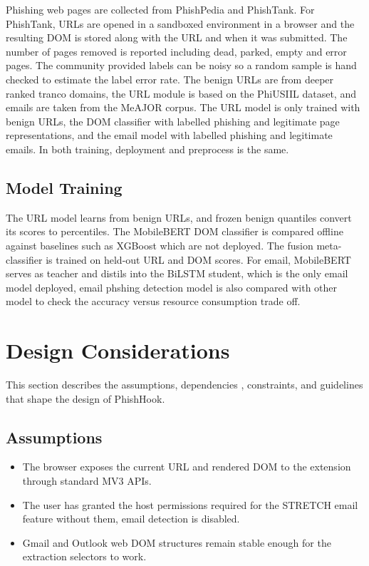 \documentclass{FastFyp}
\begin{document}
Phishing web pages are collected from PhishPedia and PhishTank. For PhishTank, URLs are opened in a sandboxed environment in a browser and the resulting DOM is stored along with the URL and when it was submitted. The number of pages removed is reported including dead, parked, empty and error pages. The community provided labels can be noisy so a random sample is hand checked to estimate the label error rate. The benign URLs are from deeper ranked tranco domains, the URL module is based on the PhiUSIIL dataset, and emails are taken from the MeAJOR corpus. The URL model is only trained with benign URLs, the DOM classifier with labelled phishing and legitimate page representations, and the email model with labelled phishing and legitimate emails. In both training, deployment and preprocess is the same.

\subsection{Model Training}

The URL model learns from benign URLs, and frozen benign quantiles convert its scores to percentiles. The MobileBERT DOM classifier is compared offline against baselines such as XGBoost which are not deployed. The fusion meta-classifier is trained on held-out URL and DOM scores. For email, MobileBERT serves as teacher and distils into the BiLSTM student, which is the only email model deployed, email phshing detection model is also compared with other model to check the accuracy versus resource consumption trade off.
\section{Design Considerations}
\label{sec:design-considerations}

This section describes the assumptions, dependencies , constraints, and guidelines that shape the design of PhishHook.


\subsection{Assumptions}
\begin{itemize}
    \item The browser exposes the current URL and rendered DOM to the extension through standard MV3 APIs.
    \item The user has granted the host permissions required for the STRETCH email feature without them, email detection is disabled.
    \item Gmail and Outlook web DOM structures remain stable enough for the extraction selectors to work.
\end{itemize}
\end{document}
